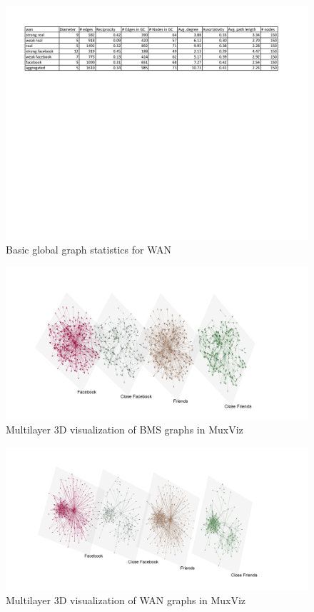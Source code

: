 \documentclass[journal]{IEEEtran}
\begin{document}
\begin{figure}[!htb]
\centering
\includegraphics[scale=.75]{wan_stats.pdf}
\caption{Basic global graph statistics for WAN}
\end{figure}

\begin{figure}[!htb]
\centering
\includegraphics[scale=.3]{bms_frchterman}
\caption{Multilayer 3D visualization of BMS graphs in MuxViz}
\end{figure}

\begin{figure}[!htb]
\centering
\includegraphics[scale=.29]{wan_bez15}
\caption{Multilayer 3D visualization of WAN graphs in MuxViz}
\end{figure}
\end{document}
